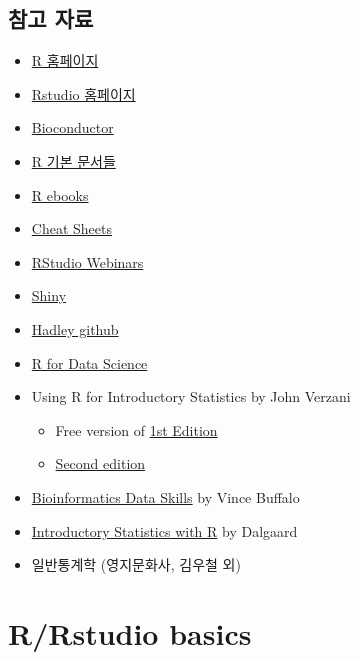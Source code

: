 \documentclass[
]{book}
\providecommand{\tightlist}{%
  \setlength{\itemsep}{0pt}\setlength{\parskip}{0pt}}
\begin{document}
\hypertarget{References}{%
\section{참고 자료}\label{References}}

\begin{itemize}
\tightlist
\item
  \href{https://www.r-project.org/}{R 홈페이지}
\item
  \href{https://www.rstudio.com/}{Rstudio 홈페이지}
\item
  \href{https://www.bioconductor.org/}{Bioconductor}
\item
  \href{https://cran.r-project.org/manuals.html}{R 기본 문서들}
\item
  \href{https://bookdown.org/}{R ebooks}
\item
  \href{https://www.rstudio.com/resources/cheatsheets/}{Cheat Sheets}
\item
  \href{https://resources.rstudio.com/}{RStudio Webinars}
\item
  \href{http://shiny.rstudio.com/tutorial/}{Shiny}
\item
  \href{https://github.com/hadley}{Hadley github}
\item
  \href{https://r4ds.had.co.nz}{R for Data Science}
\item
  Using R for Introductory Statistics by John Verzani

  \begin{itemize}
  \tightlist
  \item
    Free version of \href{https://cran.r-project.org/doc/contrib/Verzani-SimpleR.pdf}{1st Edition}
  \item
    \href{https://www.crcpress.com/Using-R-for-Introductory-Statistics-Second-Edition/Verzani/p/book/9781466590731}{Second edition}
  \end{itemize}
\item
  \href{http://2.droppdf.com/files/5aTvl/bioinformatics-data-skills.pdf}{Bioinformatics Data Skills} by Vince Buffalo
\item
  \href{http://www.academia.dk/BiologiskAntropologi/Epidemiologi/PDF/Introductory_Statistics_with_R__2nd_ed.pdf}{Introductory Statistics with R} by Dalgaard
\item
  일반통계학 (영지문화사, 김우철 외)
\end{itemize}

\hypertarget{rrstudio-basics}{%
\chapter{R/Rstudio basics}\label{rrstudio-basics}}
\end{document}
